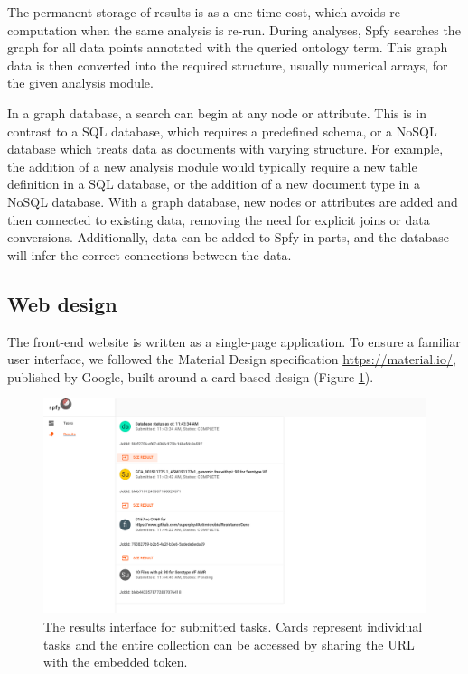 \documentclass{article}
\begin{document}
The permanent storage of results is as a one-time cost, which avoids re-computation when the same analysis is re-run. During analyses, Spfy searches the graph for all data points annotated with the queried ontology term. This graph data is then converted into the required structure, usually numerical arrays, for the given analysis module.

In a graph database, a search can begin at any node or attribute. This is in contrast to a SQL database, which requires a predefined schema, or a NoSQL database which treats data as documents with varying structure.
For example, the addition of a new analysis module would typically require a new table definition in a SQL database, or the addition of a new document type in a NoSQL database. With a graph database, new nodes or attributes are added and then connected to existing data, removing the need for explicit joins or data conversions. Additionally, data can be added to Spfy in parts, and the database will infer the correct connections between the data.

\subsection{Web design}

The front-end website is written as a single-page application.
To ensure a familiar user interface, we followed the Material Design specification \url{https://material.io/}, published by Google, built around a card-based design (Figure \ref{fig-results}).

\begin{figure}[!htb]
\begin{center}
\includegraphics[width=\textwidth]{images/results.png}
\end{center}
\caption{The results interface for submitted tasks. Cards represent individual tasks and the entire collection can be accessed by sharing the URL with the embedded token.}
\label{fig-results}
\end{figure}
\end{document}
